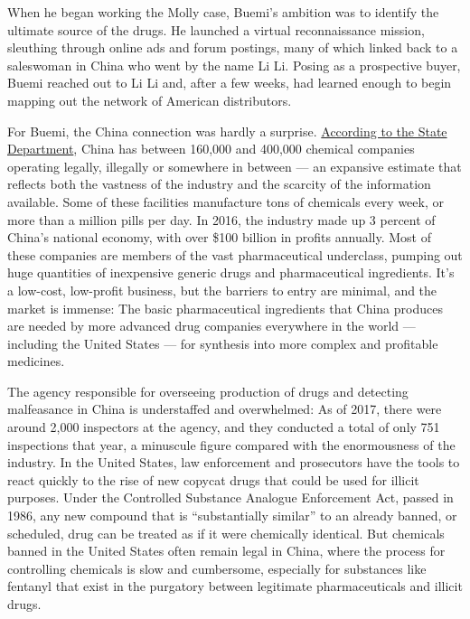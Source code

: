 When he began working the Molly case, Buemi's ambition was to identify
the ultimate source of the drugs. He launched a virtual reconnaissance
mission, sleuthing through online ads and forum postings, many of which
linked back to a saleswoman in China who went by the name Li Li. Posing
as a prospective buyer, Buemi reached out to Li Li and, after a few
weeks, had learned enough to begin mapping out the network of American
distributors.

For Buemi, the China connection was hardly a surprise.
\href{https://www.uscc.gov/Research/fentanyl-china\%E2\%80\%99s-deadly-export-united-states}{According
to the State Department}, China has between 160,000 and 400,000 chemical
companies operating legally, illegally or somewhere in between --- an
expansive estimate that reflects both the vastness of the industry and
the scarcity of the information available. Some of these facilities
manufacture tons of chemicals every week, or more than a million pills
per day. In 2016, the industry made up 3 percent of China's national
economy, with over \$100 billion in profits annually. Most of these
companies are members of the vast pharmaceutical underclass, pumping out
huge quantities of inexpensive generic drugs and pharmaceutical
ingredients. It's a low-cost, low-profit business, but the barriers to
entry are minimal, and the market is immense: The basic pharmaceutical
ingredients that China produces are needed by more advanced drug
companies everywhere in the world --- including the United States ---
for synthesis into more complex and profitable medicines.

The agency responsible for overseeing production of drugs and detecting
malfeasance in China is understaffed and overwhelmed: As of 2017, there
were around 2,000 inspectors at the agency, and they conducted a total
of only 751 inspections that year, a minuscule figure compared with the
enormousness of the industry. In the United States, law enforcement and
prosecutors have the tools to react quickly to the rise of new copycat
drugs that could be used for illicit purposes. Under the Controlled
Substance Analogue Enforcement Act, passed in 1986, any new compound
that is ``substantially similar'' to an already banned, or scheduled,
drug can be treated as if it were chemically identical. But chemicals
banned in the United States often remain legal in China, where the
process for controlling chemicals is slow and cumbersome, especially for
substances like fentanyl that exist in the purgatory between legitimate
pharmaceuticals and illicit drugs.

